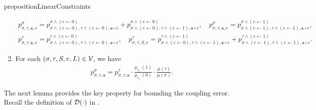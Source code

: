 \documentclass[11pt]{article}
\newcommand{\seqS}{\boldsymbol{s}}
\newcommand{\hktodo}[1]{{\color{blue}{#1}}}
\begin{document}
\begin{restatable}{proposition}{LinearConstraints}
\begin{enumerate}[(1)]
\begin{align}
                p^{\sigma}_{\sigma,\tau, \seqS,e}=p^{\sigma \land (e\gets 0)}_{\sigma\land (e\gets 0),\tau\land (e\gets 0), \seqS\circ e}+p^{\sigma\land (e\gets 0)}_{\sigma\land (e\gets 0),\tau\land (e\gets 1), \seqS \circ e}, \quad  p^{\sigma}_{\sigma,\tau, \seqS,e}=p^{\sigma\land (e\gets 1)}_{\sigma\land (e\gets 1),\tau\land (e\gets 1), \seqS\circ e},
            \end{align}
            \begin{align}\label{eqn-inner-child-sum4}
                p^{\tau}_{\sigma,\tau, \seqS,e}=p^{\tau\land (e\gets 0)}_{\sigma\land (e\gets 0),\tau\land (e\gets 0), \seqS\circ e}, \quad  p^{\tau}_{\sigma,\tau,S,e}=p^{\tau\land (e\gets 1)}_{\sigma\land (e\gets 0),\tau\land (e\gets 1), \seqS \circ e} + p^{\tau \land (e\gets 1)}_{\sigma\land (e\gets 1),\tau\land (e\gets 1), \seqS\circ e}.
            \end{align}
            \item For each $(\sigma, \tau, S, v, L) \in \mathcal{V}$, we have
            \begin{align}\label{eqn-ratio}
            	{p^{\sigma}_{\sigma,\tau, \seqS}} = p^{\tau}_{\sigma,\tau, \seqS} \cdot \frac{\mu_{e_{\bot}}(1)}{\mu_{e_{\bot}}(0)}\cdot \frac{ \mu(\tau)}{ \mu(\sigma)}.
            \end{align}
        \end{enumerate}
    \end{restatable}
    


    \hktodo{polish this paragraph}
    The next lemma provides the key property for bounding the coupling error.
    Recall the definition of $\mathcal{D}(\cdot)$ in .
\end{document}
